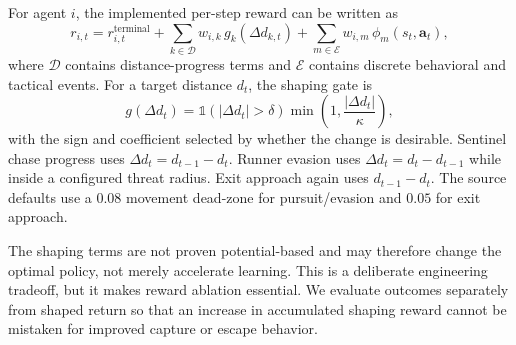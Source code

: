 \documentclass[journal]{IEEEtran}
\begin{document}
For agent $i$, the implemented per-step reward can be written as
\begin{equation}
r_{i,t}=r^{\mathrm{terminal}}_{i,t}+\sum_{k\in\mathcal{D}}w_{i,k}\,g_k(\Delta d_{k,t})+
\sum_{m\in\mathcal{E}}w_{i,m}\,\phi_m(s_t,\mathbf{a}_t),
\end{equation}
where $\mathcal{D}$ contains distance-progress terms and $\mathcal{E}$ contains discrete behavioral and tactical events. For a target distance $d_t$, the shaping gate is
\begin{equation}
g(\Delta d_t)=\mathbb{1}(|\Delta d_t|>\delta)
\min\left(1,\frac{|\Delta d_t|}{\kappa}\right),
\end{equation}
with the sign and coefficient selected by whether the change is desirable. Sentinel chase progress uses $\Delta d_t=d_{t-1}-d_t$. Runner evasion uses $\Delta d_t=d_t-d_{t-1}$ while inside a configured threat radius. Exit approach again uses $d_{t-1}-d_t$. The source defaults use a $0.08$ movement dead-zone for pursuit/evasion and $0.05$ for exit approach.

The shaping terms are not proven potential-based and may therefore change the optimal policy, not merely accelerate learning. This is a deliberate engineering tradeoff, but it makes reward ablation essential. We evaluate outcomes separately from shaped return so that an increase in accumulated shaping reward cannot be mistaken for improved capture or escape behavior.
\end{document}
